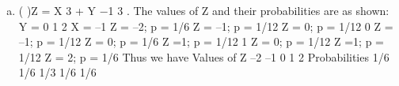 \documentclass[a4paper,12pt]{article}
\begin{document}
\begin{enumerate}[(a)]
\begin{eqnarray*}
Cov(X, Y) &=& E[XY] – E[X]E[Y] \\ 
&=& 1
6 − (0)(1) \\ &=& 1/6\\
\end{eqnarray*}

\begin{eqnarray*}Corr(X, Y) \\ &=& \frac{Cov(X, Y)}{Var(X ) Var(Y  )}
\\ &=& \frac{1/6}{2/3} \\ &=& \frac{1/6}{2/3}
\end{eqnarray*}
X and Y are not independent: their correlation (or covariance) is non-zero. (In fact we
saw in part (i) that they are linearly related: Y = X + 1.)

\begin{framed}
(iv) Find the probability distribution of Z = X 3 + (Y – 1) 3.
\end{framed}
\item ( )Z = X 3 + Y −1 3 . The values of Z and their probabilities are as shown:
Y = 0 1 2
X = –1 Z = –2; p = 1/6 Z = –1; p = 1/12 Z = 0; p = 1/12
0 Z = –1; p = 1/12 Z = 0; p = 1/6 Z =1; p = 1/12
1 Z = 0; p = 1/12 Z =1; p = 1/12 Z = 2; p = 1/6
Thus we have
Values of Z –2 –1 0 1 2
Probabilities 1/6 1/6 1/3 1/6 1/6
\end{enumerate}
\end{document}
